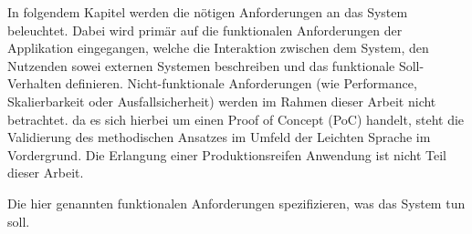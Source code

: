 
In folgendem Kapitel werden die nötigen Anforderungen an das System beleuchtet.
Dabei wird primär auf die funktionalen Anforderungen der Applikation eingegangen, welche die Interaktion zwischen dem System, den Nutzenden sowei externen Systemen beschreiben und das funktionale Soll-Verhalten definieren. Nicht-funktionale Anforderungen (wie Performance, Skalierbarkeit oder Ausfallsicherheit) werden im Rahmen dieser Arbeit nicht betrachtet. da es sich hierbei um einen Proof of Concept (PoC) handelt, steht die Validierung des methodischen Ansatzes im Umfeld der Leichten Sprache im Vordergrund. Die Erlangung einer Produktionsreifen Anwendung ist nicht Teil dieser Arbeit.

Die hier genannten funktionalen Anforderungen spezifizieren, was das System tun soll.

